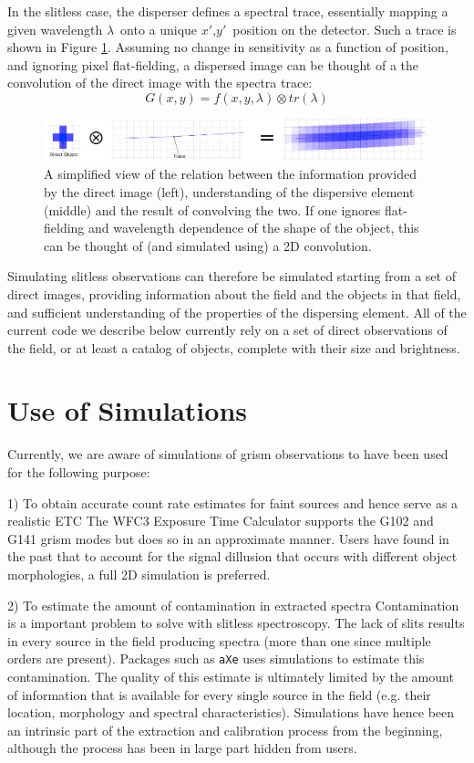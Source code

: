 \documentclass[preprint]{aastex}
\begin{document}
In the slitless case, the disperser defines a spectral trace, essentially mapping a given wavelength $\lambda$\ onto a unique $x'$,$y'$\ position on the detector. Such a trace is shown in Figure \ref{fig:1}. Assuming no change in sensitivity as a function of position, and ignoring pixel flat-fielding, a dispersed image can be thought of a the convolution of the direct image with the spectra trace:
\begin{dmath}
G(x,y) =  f(x,y,\lambda) \otimes tr(\lambda)
\end{dmath}

\begin{figure}[!ht]
\centering
\includegraphics[width=7.in]{"Figures/Grism_Equation"}
\caption{A simplified view of the relation between the information provided by the direct image (left), understanding of the dispersive element (middle) and the result of convolving the two. If one ignores flat-fielding and wavelength dependence of the shape of the object, this can be thought of (and simulated using) a 2D convolution.}
\label{fig:1}
\end{figure}

Simulating slitless observations can therefore be simulated starting from a set of direct images, providing information about the field and the objects in that field, and sufficient understanding of the properties of the dispersing element.
All of the current code we describe below currently rely on a set of direct observations of the field, or at least a catalog of objects, complete with their size and brightness. 

\section{Use of Simulations}
Currently, we are aware of simulations of grism observations to have been used for the following purpose:

1) To obtain accurate count rate estimates for faint sources and hence serve as a realistic ETC
The WFC3 Exposure Time Calculator supports the G102 and G141 grism modes but does so in an approximate manner. Users have found in the past that to account for the signal dillusion that occurs with different object morphologies, a full 2D simulation is preferred. 

2) To estimate the amount of contamination in extracted spectra
Contamination is a important problem to solve with slitless spectroscopy. The lack of slits results in every source in the field producing spectra (more than one since multiple orders are present). Packages such as \texttt{aXe} uses simulations to estimate this contamination. The quality of this estimate is ultimately limited by the amount of information that is available for every single source in the field (e.g. their location, morphology and spectral characteristics). Simulations have hence been an intrinsic part of the extraction and calibration process from the beginning, although the process has been in large part hidden from users.
\end{document}
